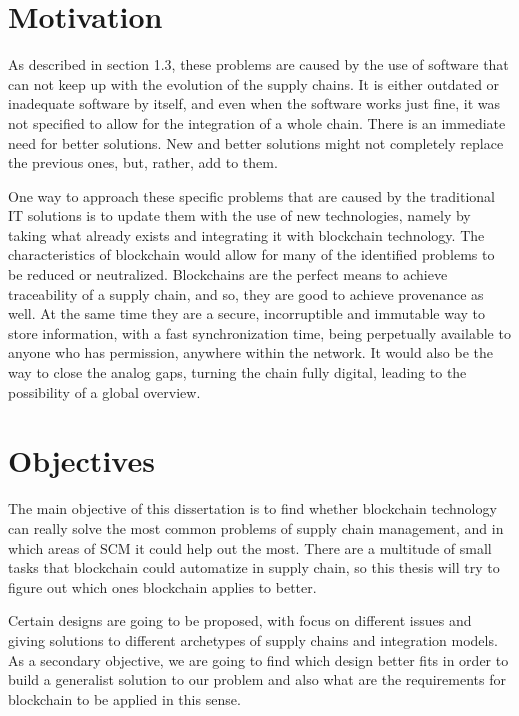 
\section{Motivation} \label{sec:motivation}

As described in section 1.3, these problems are caused by the use of software that can not keep up with the evolution of the supply chains. It is either outdated or inadequate software by itself, and even when the software works just fine, it was not specified to allow for the integration of a whole chain. There is an immediate need for better solutions. New and better solutions might not completely replace the previous ones, but, rather, add to them.

One way to approach these specific problems that are caused by the traditional IT solutions is to update them with the use of new technologies, namely by taking what already exists and integrating it with blockchain technology. The characteristics of blockchain would allow for many of the identified problems to be reduced or neutralized. Blockchains are the perfect means to achieve traceability of a supply chain, and so, they are good to achieve provenance as well. At the same time they are a secure, incorruptible and immutable way to store information, with a fast synchronization time, being perpetually available to anyone who has permission, anywhere within the network. It would also be the way to close the analog gaps, turning the chain fully digital, leading to the possibility of a global overview.

\section{Objectives}
\label{sec:objectives}
The main objective of this dissertation is to find whether blockchain technology can really solve the most common problems of supply chain management, and in which areas of SCM it could help out the most. There are a multitude of small tasks that blockchain could automatize in supply chain, so this thesis will try to figure out which ones blockchain applies to better. 

Certain designs are going to be proposed, with focus on different issues and giving solutions to different archetypes of supply chains and integration models. As a secondary objective, we are going to find which design better fits in order to build a generalist solution to our problem and also what are the requirements for blockchain to be applied in this sense.

